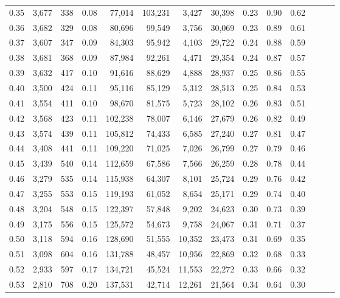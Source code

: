 \begin{tabular}{rrrrrrrrrrrrrr}
0.35 &  3,677 &  338 &  0.08 &   77,014 &  103,231 &   3,427 &  30,398 &  0.23 &  0.90 &      0.62 \\
0.36 &  3,682 &  329 &  0.08 &   80,696 &   99,549 &   3,756 &  30,069 &  0.23 &  0.89 &      0.61 \\
0.37 &  3,607 &  347 &  0.09 &   84,303 &   95,942 &   4,103 &  29,722 &  0.24 &  0.88 &      0.59 \\
0.38 &  3,681 &  368 &  0.09 &   87,984 &   92,261 &   4,471 &  29,354 &  0.24 &  0.87 &      0.57 \\
0.39 &  3,632 &  417 &  0.10 &   91,616 &   88,629 &   4,888 &  28,937 &  0.25 &  0.86 &      0.55 \\
0.40 &  3,500 &  424 &  0.11 &   95,116 &   85,129 &   5,312 &  28,513 &  0.25 &  0.84 &      0.53 \\
0.41 &  3,554 &  411 &  0.10 &   98,670 &   81,575 &   5,723 &  28,102 &  0.26 &  0.83 &      0.51 \\
0.42 &  3,568 &  423 &  0.11 &  102,238 &   78,007 &   6,146 &  27,679 &  0.26 &  0.82 &      0.49 \\
0.43 &  3,574 &  439 &  0.11 &  105,812 &   74,433 &   6,585 &  27,240 &  0.27 &  0.81 &      0.47 \\
0.44 &  3,408 &  441 &  0.11 &  109,220 &   71,025 &   7,026 &  26,799 &  0.27 &  0.79 &      0.46 \\
0.45 &  3,439 &  540 &  0.14 &  112,659 &   67,586 &   7,566 &  26,259 &  0.28 &  0.78 &      0.44 \\
0.46 &  3,279 &  535 &  0.14 &  115,938 &   64,307 &   8,101 &  25,724 &  0.29 &  0.76 &      0.42 \\
0.47 &  3,255 &  553 &  0.15 &  119,193 &   61,052 &   8,654 &  25,171 &  0.29 &  0.74 &      0.40 \\
0.48 &  3,204 &  548 &  0.15 &  122,397 &   57,848 &   9,202 &  24,623 &  0.30 &  0.73 &      0.39 \\
0.49 &  3,175 &  556 &  0.15 &  125,572 &   54,673 &   9,758 &  24,067 &  0.31 &  0.71 &      0.37 \\
0.50 &  3,118 &  594 &  0.16 &  128,690 &   51,555 &  10,352 &  23,473 &  0.31 &  0.69 &      0.35 \\
0.51 &  3,098 &  604 &  0.16 &  131,788 &   48,457 &  10,956 &  22,869 &  0.32 &  0.68 &      0.33 \\
0.52 &  2,933 &  597 &  0.17 &  134,721 &   45,524 &  11,553 &  22,272 &  0.33 &  0.66 &      0.32 \\
0.53 &  2,810 &  708 &  0.20 &  137,531 &   42,714 &  12,261 &  21,564 &  0.34 &  0.64 &      0.30 \\

\end{tabular}
